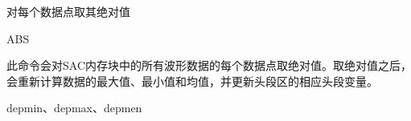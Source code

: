 \label{cmd:abs}

对每个数据点取其绝对值

\begin{SACSTX}
ABS
\end{SACSTX}

此命令会对SAC内存块中的所有波形数据的每个数据点取绝对值。取绝对值之后，
会重新计算数据的最大值、最小值和均值，并更新头段区的相应头段变量。

depmin、depmax、depmen
